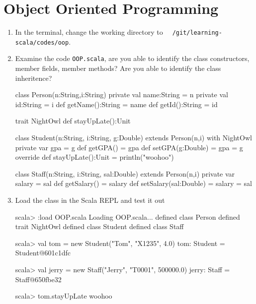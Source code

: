 \documentclass[10pt]{article}
\begin{document}
\section{Object Oriented Programming}

\begin{enumerate}
\item In the terminal, change the working directory to {\tt
    {}~/git/learning-scala/codes/oop}.
\item Examine the code {\tt OOP.scala}, are you able to identify the
  class constructors, member fields, member methods? Are you able to
  identify the class inheritence? 
\begin{code}
class Person(n:String,i:String) {
	private val name:String = n
	private val id:String   = i
	def getName():String = name
	def getId():String = id
}

trait NightOwl {
	def stayUpLate():Unit
}

class Student(n:String, i:String, g:Double) extends Person(n,i) with NightOwl {
	private var gpa = g
	def getGPA() = gpa
	def setGPA(g:Double) =
	{
		gpa = g
	}
	override def stayUpLate():Unit =
	{
		println("woohoo")
	}
}

class Staff(n:String, i:String, sal:Double) extends Person(n,i) {
	private var salary = sal
	def getSalary() = salary
	def setSalary(sal:Double) =
	{
		salary = sal
	}
}
\end{code}
\item Load the class in the Scala REPL and test it out
\begin{code}
scala> :load OOP.scala
Loading OOP.scala...
defined class Person
defined trait NightOwl
defined class Student
defined class Staff

scala> val tom = new Student("Tom", "X1235", 4.0)
tom: Student = Student@601c1dfc

scala> val jerry = new Staff("Jerry", "T0001", 500000.0)
jerry: Staff = Staff@650fbe32

scala> tom.stayUpLate
woohoo
\end{code}
\end{enumerate}
\end{document}
